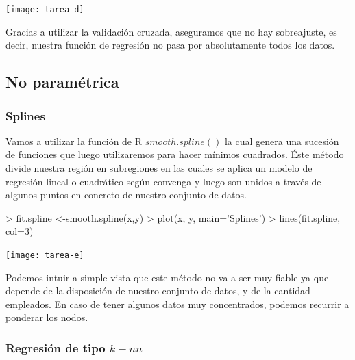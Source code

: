 \documentclass[a4paper,12pt]{article}
\begin{document}
\texttt{[image: tarea-d]}

Gracias a utilizar la validaci\'on cruzada, aseguramos que no hay sobreajuste, es decir, nuestra funci\'on de regresi\'on no pasa por absolutamente todos los datos.

\pagebreak


\subsection{No paramétrica}

\subsubsection{Splines}

Vamos a utilizar la función de R $smooth.spline()$ la cual genera una sucesión de funciones que luego utilizaremos para hacer mínimos cuadrados. Éste método divide nuestra región en subregiones en las cuales se aplica un modelo de regresión lineal o cuadrático según convenga y luego son unidos a través de algunos puntos en concreto de nuestro conjunto de datos. 

\begin{Schunk}
\begin{Sinput}
> fit.spline <-smooth.spline(x,y)
> plot(x, y, main='Splines')
> lines(fit.spline, col=3)
\end{Sinput}
\end{Schunk}
\texttt{[image: tarea-e]}

Podemos intuir a simple vista que este método no va a ser muy fiable ya que depende de la disposición de nuestro conjunto de datos, y de la cantidad empleados. En caso de tener algunos datos muy concentrados, podemos recurrir a ponderar los nodos.


\subsubsection{Regresi\'on de tipo $k-nn$}
\end{document}

